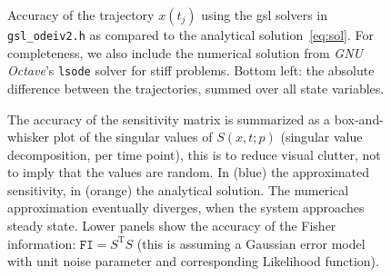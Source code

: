 \documentclass[utf8,english,DIV=12]{scrartcl}
\begin{document}
\begin{figure}
  \centering\sffamily\firalining
  \hspace*{-2cm}
  \caption[trajectory accuracy of gsl solvers]{Accuracy of the
    trajectory $x(t_j)$ using the gsl solvers in
    \texttt{gsl\_odeiv2.h} as compared to the analytical
    solution~\eqref{eq:sol}. For completeness, we also include the
    numerical solution from \emph{GNU Octave}'s \texttt{lsode} solver
    for stiff problems. Bottom left: the absolute difference between
    the trajectories, summed over all state variables.}
\label{fig:trajectory}
\end{figure}

\begin{figure}
  \centering\sffamily\firalining
  \hspace*{-2cm}
  \caption[Sensitivity Approximation]{The accuracy of the sensitivity
    matrix is summarized as a box-and-whisker plot of the singular
    values of $S(x,t;p)$ (singular value decomposition, per time
    point), this is to reduce visual clutter, not to imply that the
    values are random. In (blue) the approximated sensitivity, in
    (orange) the analytical solution. The numerical approximation
    eventually diverges, when the system approaches steady
    state. Lower panels show the accuracy of the Fisher information:
    $\texttt{FI} = S^{\text{T}}S$ (this is assuming a Gaussian error
    model with unit noise parameter and corresponding Likelihood
    function).}
\label{fig:fi}
\end{figure}
\end{document}
